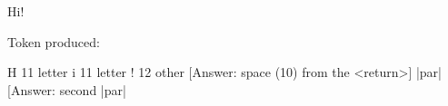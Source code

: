 Hi!


Token produced:

H 11 letter
i 11 letter
! 12 other
[Answer: space (10) from the <return>]
|par|
[Answer: second |par|


\bye
